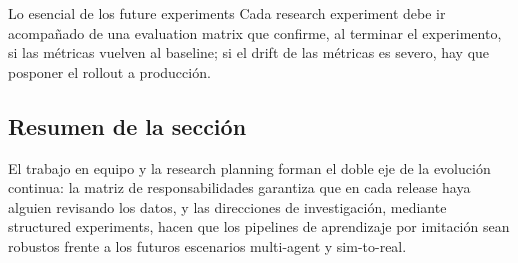 \begin{importantbox}{Lo esencial de los future experiments}
Cada research experiment debe ir acompañado de una evaluation matrix que confirme, al terminar el experimento, si las métricas vuelven al baseline; si el drift de las métricas es severo, hay que posponer el rollout a producción.
\end{importantbox}

\subsection{Resumen de la sección}

El trabajo en equipo y la research planning forman el doble eje de la evolución continua: la matriz de responsabilidades garantiza que en cada release haya alguien revisando los datos, y las direcciones de investigación, mediante structured experiments, hacen que los pipelines de aprendizaje por imitación sean robustos frente a los futuros escenarios multi-agent y sim-to-real.
